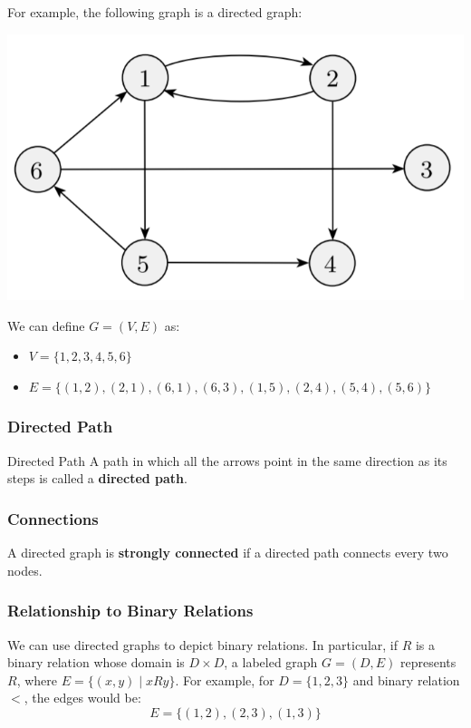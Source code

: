 \documentclass[letterpaper]{article}
\begin{document}
For example, the following graph is a directed graph:
\begin{center}
    \includegraphics[scale=0.5]{../assets/directed_graph.png}
\end{center}
We can define $G = (V, E)$ as: 
\begin{itemize}
    \item $V = \{1, 2, 3, 4, 5, 6\}$
    \item $E = \{(1, 2), (2, 1), (6, 1), (6, 3), (1, 5), (2, 4), (5, 4), (5, 6)\}$
\end{itemize}

\subsubsection{Directed Path}
\begin{definition}{Directed Path}{}
    A path in which all the arrows point in the same direction as its steps is called a \textbf{directed path}. 
\end{definition}

\subsubsection{Connections}
\begin{definition}{}{}
    A directed graph is \textbf{strongly connected} if a directed path connects every two nodes.
\end{definition}

\subsubsection{Relationship to Binary Relations}
We can use directed graphs to depict binary relations. In particular, if $R$ is a binary relation whose domain is $D \times D$, a labeled graph $G = (D, E)$ represents $R$, where $E = \{(x, y) \mid xRy\}$. For example, for $D = \{1, 2, 3\}$ and binary relation $<$, the edges would be: 
\[E = \{(1, 2), (2, 3), (1, 3)\}\]
\end{document}
